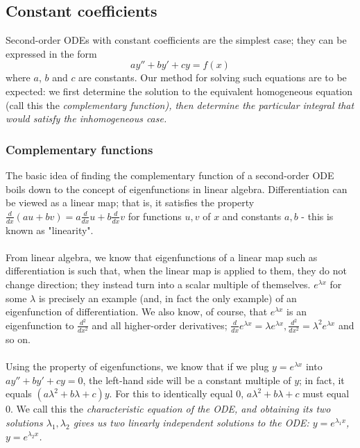 \documentclass{article}
\begin{document}
\subsection{Constant coefficients}
Second-order ODEs with constant coefficients are the simplest case; they can be expressed in the form
\begin{equation*}
    ay'' + by' + cy = f(x)
\end{equation*}
where $a$, $b$ and $c$ are constants. Our method for solving such equations are to be expected: we first determine the solution to the equivalent homogeneous equation (call this the \it complementary function), \normalfont then determine the particular integral that would satisfy the inhomogeneous case.
\subsubsection{Complementary functions}
The basic idea of finding the complementary function of a second-order ODE boils down to the concept of eigenfunctions in linear algebra. Differentiation can be viewed as a linear map; that is, it satisfies the property $\frac{d}{dx}(au + bv) = a\frac{d}{dx}u + b\frac{d}{dx}v$ for functions $u, v$ of $x$ and constants $a, b$ - this is known as "linearity".
\\ \\
From linear algebra, we know that eigenfunctions of a linear map such as differentiation is such that, when the linear map is applied to them, they do not change direction; they instead turn into a scalar multiple of themselves. $e^{\lambda x}$ for some $\lambda$ is precisely an example (and, in fact the only example) of an eigenfunction of differentiation. We also know, of course, that $e^{\lambda x}$ is an eigenfunction to $\frac{d^2}{dx^2}$ and all higher-order derivatives; $\frac{d}{dx} e^{\lambda x} = \lambda e^{\lambda x}, \frac{d^2}{dx^2} = \lambda^2 e^{\lambda x}$ and so on.\\ \\
Using the property of eigenfunctions, we know that if we plug $y = e^{\lambda x}$ into $ay'' + by' + cy = 0$, the left-hand side will be a constant multiple of $y$; in fact, it equals $(a\lambda^2 + b\lambda + c)y$. For this to identically equal 0, $a\lambda^2 + b\lambda + c$ must equal 0. We call this the \it characteristic equation \normalfont of the ODE, and obtaining its two solutions $\lambda_1, \lambda_2$ gives us two linearly independent solutions to the ODE: $y=e^{\lambda_1 x}$, $y=e^{\lambda_2 x}$. \\ \\
\end{document}
